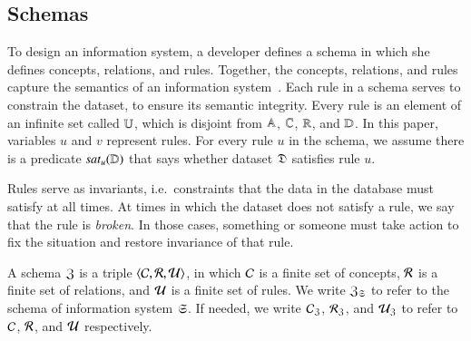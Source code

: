 \documentclass{elsarticle}
\begin{document}
\subsection{Schemas}
\label{sct:Schemas}
   To design an information system, a developer defines a schema in which she defines concepts, relations, and rules.
   Together, the concepts, relations, and rules capture the semantics of an information system~\cite{Spivak2012}.
   Each rule in a schema serves to constrain the dataset, to ensure its semantic integrity.
   Every rule is an element of an infinite set called $\mathbb{U}$,
   which is disjoint from $\mathbb{A}$, $\mathbb{C}$, $\mathbb{R}$, and $\mathbb{D}$.
   In this paper, variables $u$ and $v$ represent rules.
   For every rule $u$ in the schema, we assume there is a predicate $\text{\it sat\/}_{u}(\mathbb{D})$
   that says whether dataset $\mathfrak{D}$ satisfies rule $u$.

   Rules serve as invariants,
   i.e.\ constraints that the data in the database must satisfy at all times.
   At times in which the dataset does not satisfy a rule, we say that the rule is {\em broken}.
   In those cases, something or someone must take action to fix the situation and restore invariance of that rule.

   A schema $\mathfrak{Z}$ is a triple $\langle{\mathcal{C}},{\mathcal{R}},{\mathcal{U}}\rangle$,
   in which $\mathcal{C}$ is a finite set of concepts,
   $\mathcal{R}$ is a finite set of relations,
   and $\mathcal{U}$ is a finite set of rules.
   We write $\mathfrak{Z}_{\mathfrak{S}}$ to refer to the schema of information system $\mathfrak{S}$.
   If needed, we write $\mathcal{C}_{\mathfrak{Z}}$, $\mathcal{R}_{\mathfrak{Z}}$, and $\mathcal{U}_{\mathfrak{Z}}$ to refer to $\mathcal{C}$, $\mathcal{R}$, and $\mathcal{U}$ respectively.
\end{document}
